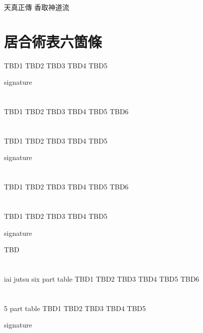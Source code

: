 \documentclass[dvipdfmx, a4paper, 12pt]{utarticle}
\begin{document}
\begin{CJK*}{UTF8}{min}
\CJKtilde
\begin{landscape}

\newpage
\pagestyle{empty}
天真正傳
香取神道流
\section{居合術表六箇條}
TBD1
TBD2
TBD3
TBD4
TBD5

signature

\newpage
\pagestyle{empty}
\section{}
TBD1
TBD2
TBD3
TBD4
TBD5
TBD6
\section{}
TBD1
TBD2
TBD3
TBD4
TBD5

signature

\newpage
\pagestyle{empty}
\section{}
TBD1
TBD2
TBD3
TBD4
TBD5
TBD6
\section{}
TBD1
TBD2
TBD3
TBD4
TBD5

signature

\newpage
\pagestyle{empty}
TBD
\section{}
iai jutsu six part table
TBD1
TBD2
TBD3
TBD4
TBD5
TBD6
\section{}
5 part table
TBD1
TBD2
TBD3
TBD4
TBD5

signature

\end{landscape}
\end{CJK*}
\end{document}
